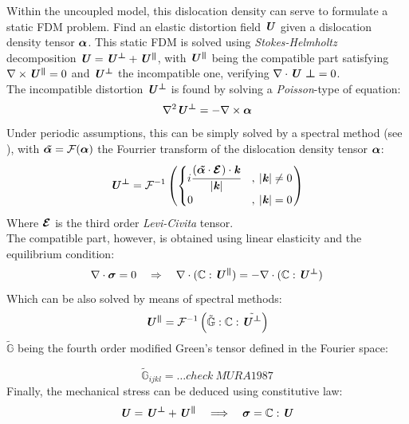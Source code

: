 \documentclass{article}
\begin{document}
Within the uncoupled model, this dislocation density can serve to formulate a static FDM problem. Find an elastic distortion field $\bm{\mathit{U}}$ given a dislocation density tensor $\bm{\mathit{\alpha}}$. This static FDM is solved using \emph{Stokes-Helmholtz} decomposition $\bm{\mathit{U}} = \bm{\mathit{U^\perp}}+\bm{\mathit{U^\parallel}}$, with $\bm{\mathit{U^\parallel}}$ being the compatible part satisfying $\nabla \times \bm{\mathit{U^\parallel}}=0$ and  $\bm{\mathit{U^\perp}}$ the incompatible one, verifying $\nabla \cdot \bm{\mathit{U\perp}}=0$.\\
The incompatible distortion $\bm{\mathit{U^\perp}}$ is found by solving a \emph{Poisson}-type of equation:
\begin{equation}
   \nabla^2 \bm{\mathit{U^\perp}} = - \nabla \times \bm{\mathit{\alpha}}
\end{equation}
Under periodic assumptions, this can be simply solved by a spectral method (see \cite{upadhyayCouplingPhaseField2024}), with $\bm{\mathit{\tilde{\alpha}}}= \mathcal{F}(\mathcal{\bm{\mathit{\alpha}}})$ the Fourrier transform of the dislocation density tensor $\bm{\mathit{\alpha}}$:
\begin{equation}
   \bm{\mathit{U^\perp}} = \mathcal{F}^{-1}\left(
      \begin{cases}
         i\cfrac{(\bm{\mathit{\tilde{\alpha}}}\cdot{\bm{\mathcal{E}_{}}})\cdot \bm{\mathit{k}}}{|\bm{\mathit{k}}|}&, \: |\bm{\mathit{k}}|\neq 0\\
         0&, \: |\bm{\mathit{k}}|= 0\\
      \end{cases}
   \right)
\end{equation}
Where ${\bm{\mathcal{E}_{}}}$ is the third order \emph{Levi-Civita} tensor.\\


The compatible part, however, is obtained using linear elasticity and the equilibrium condition:
\begin{equation}
   \nabla \cdot \bm{\mathit{\sigma}} = 0 \quad \Rightarrow \quad \nabla \cdot(\mathbb{C}: \bm{\mathit{U^\parallel}}) = -\nabla \cdot(\mathbb{C}: \bm{\mathit{U^\perp}})
\end{equation}
Which can be also solved by means of spectral methods:
\begin{equation}
   \bm{\mathit{U^\parallel}} = \mathcal{F}^{-1}\left( \tilde{\mathbb{G}} : \mathbb{C}:\tilde{\bm{\mathit{U^\perp}}}\right)
\end{equation}
$\tilde{\mathbb{G}}$ being the fourth order modified Green's tensor defined in the Fourier space:

\begin{equation}
   \tilde{\mathbb{G}}_{ijkl} = \dots check \: MURA1987
\end{equation}
Finally, the mechanical stress can be deduced using constitutive law:
\begin{equation}
   \bm{\mathit{U}} =\bm{\mathit{U^\perp}} +\bm{\mathit{U^\parallel}} \quad \Longrightarrow \quad \bm{\mathit{\sigma}} = \mathbb{C}:\bm{\mathit{U}} 
\end{equation}
\end{document}

